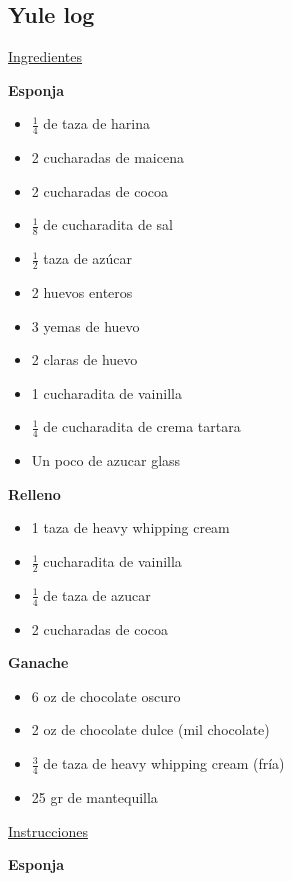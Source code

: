 \subsection{Yule log}

\underline{Ingredientes}

\textbf{Esponja}

\begin{itemize}
\item $\frac{1}{4}$ de taza de harina
\item 2 cucharadas de maicena
\item 2 cucharadas de cocoa
\item $\frac{1}{8}$ de cucharadita de sal
\item $\frac{1}{2}$ taza de az\'ucar
\item 2 huevos enteros
\item 3 yemas de huevo
\item 2 claras de huevo
\item 1 cucharadita de vainilla
\item $\frac{1}{4}$ de cucharadita de crema tartara
\item Un poco de azucar glass
\end{itemize}

\textbf{Relleno}

\begin{itemize}
\item 1 taza de heavy whipping cream
\item $\frac{1}{2}$ cucharadita de vainilla
\item $\frac{1}{4}$ de taza de azucar
\item 2 cucharadas de cocoa
\end{itemize}

\textbf{Ganache}

\begin{itemize}
\item 6 oz de chocolate oscuro
\item 2 oz de chocolate dulce (mil chocolate)
\item $\frac{3}{4}$ de taza de heavy whipping cream (fría)
\item 25 gr de mantequilla
\end{itemize}

\underline{Instrucciones}

\textbf{Esponja}

